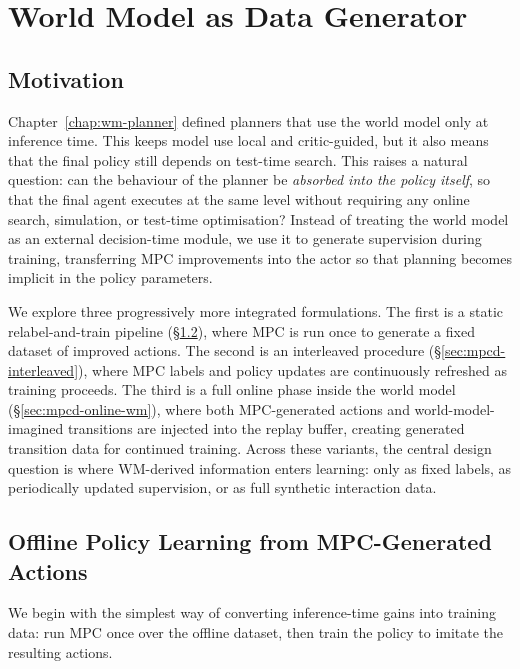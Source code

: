 \chapter{World Model as Data Generator}
\label{chap:mpc-distillation}

\section{Motivation}
\label{sec:mpcd-motivation}

Chapter~\ref{chap:wm-planner} defined planners that use the world model
only at inference time. This keeps model use local and critic-guided, but
it also means that the final policy still depends on test-time search.
This raises a natural question: can the behaviour of the planner be
\emph{absorbed into the policy itself}, so that the final agent
executes at the same level without requiring any online search,
simulation, or test-time optimisation?
Instead of treating the world model as an external decision-time module,
we use it to generate supervision during training, transferring MPC
improvements into the actor so that planning becomes implicit in the
policy parameters.

We explore three progressively more integrated formulations. The
first is a static relabel-and-train pipeline
(\S\ref{sec:mpcd-offline}), where MPC is run once to generate a fixed
dataset of improved actions. The second is an interleaved procedure
(\S\ref{sec:mpcd-interleaved}), where MPC labels and policy updates
are continuously refreshed as training proceeds. The third is a full
online phase inside the world model
(\S\ref{sec:mpcd-online-wm}), where both MPC-generated actions and
world-model-imagined transitions are injected into the replay buffer,
creating generated transition data for continued training.
Across these variants, the central design question is where WM-derived
information enters learning: only as fixed labels, as periodically
updated supervision, or as full synthetic interaction data.

\section{Offline Policy Learning from MPC-Generated Actions}
\label{sec:mpcd-offline}

We begin with the simplest way of converting inference-time gains into
training data: run MPC once over the offline dataset, then train the
policy to imitate the resulting actions.

